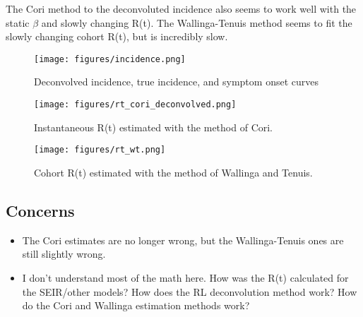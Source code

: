 \documentclass{article}
\begin{document}
The Cori method to the deconvoluted incidence also seems to work well with the static $\beta$ and slowly changing R(t). The Wallinga-Tenuis method seems to fit the slowly changing cohort R(t), but is incredibly slow.

\begin{figure}[h!]
    \centering
    \texttt{[image: figures/incidence.png]}
    \caption{Deconvolved incidence, true incidence, and symptom onset curves}
    \label{fig:my_label}
\end{figure}

\begin{figure}[h!]
    \centering
    \texttt{[image: figures/rt\_cori\_deconvolved.png]}
    \caption{Instantaneous R(t) estimated with the method of Cori.}
    \label{fig:my_label}
\end{figure}

\begin{figure}[h!]
    \centering
    \texttt{[image: figures/rt\_wt.png]}
    \caption{Cohort R(t) estimated with the method of Wallinga and Tenuis.}
    \label{fig:my_label}
\end{figure}


\subsection{Concerns}
\begin{itemize}
    \item The Cori estimates are no longer wrong, but the Wallinga-Tenuis ones are still slightly wrong. 
    \item I don't understand most of the math here. How was the R(t) calculated for the SEIR/other models? How does the RL deconvolution method work? How do the Cori and Wallinga estimation methods work?
\end{itemize}
\end{document}
